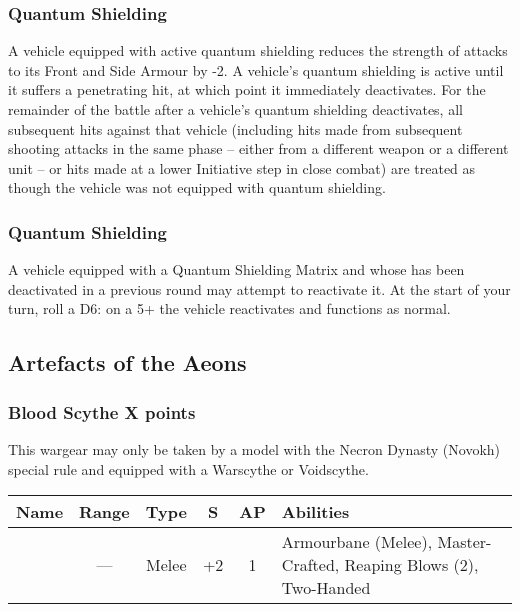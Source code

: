 \subsubsection{Quantum Shielding} \label{Quantum Shielding}

A vehicle equipped with active quantum shielding reduces the strength of attacks to its Front and Side Armour by -2. A vehicle’s quantum shielding is active until it suffers a penetrating hit, at which point it immediately
deactivates. For the remainder of the battle after a vehicle’s quantum shielding deactivates, all subsequent hits against that vehicle (including hits made from subsequent shooting attacks in the same phase – either
from a different weapon or a different unit – or hits made at a lower Initiative step in close combat) are treated as though the vehicle was not equipped with quantum shielding.

\subsubsection{Quantum Shielding} \label{Quantum Shielding Matrix}

A vehicle equipped with a Quantum Shielding Matrix and  whose  has been deactivated in a previous round may attempt to reactivate it. At the start of your turn, roll a D6: on a 5+ the vehicle  reactivates and functions as normal.

\newpage
\subsection{Artefacts of the Aeons} \label{Artefacts of the Aeons}

\subsubsection[Blood Scythe]{Blood Scythe \dotfill X points}

This wargear may only be taken by a model with the Necron Dynasty (Novokh) special rule and equipped with a Warscythe or Voidscythe.

\label{Blood Scythe}
\noindent
\begin{NiceTabular}{m{130 pt} *{4}{c} >{\raggedright\arraybackslash}p{240pt}}
	Name & Range & Type & S & AP & Abilities \\
	\hline
	 & — & Melee & +2 & 1 & Armourbane (Melee), Master-Crafted, Reaping Blows (2), Two-Handed \\
\end{NiceTabular}

